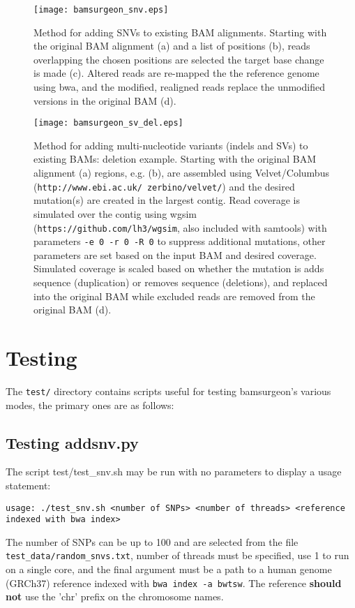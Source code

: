\documentclass[letterpaper,11pt]{article}
\begin{document}
\newpage %
\begin{figure}[!h]
\centering
\texttt{[image: bamsurgeon\_snv.eps]}
\caption{Method for adding SNVs to existing BAM alignments. Starting with the original BAM alignment (a) and a list of positions (b), reads overlapping the chosen positions are selected the target base change is made (c). Altered reads are re-mapped the the reference genome using bwa, and the modified, realigned reads replace the unmodified versions in the original BAM (d).}
\end{figure}

\newpage %

\begin{figure}[!h]
\centering
\texttt{[image: bamsurgeon\_sv\_del.eps]}
\caption{Method for adding multi-nucleotide variants (indels and SVs) to existing BAMs: deletion example. Starting with the original BAM alignment (a) regions, e.g. (b), are assembled using Velvet/Columbus (\texttt{http://www.ebi.ac.uk/~zerbino/velvet/}) and the desired mutation(s) are created in the largest contig. Read coverage is simulated over the contig using wgsim (\texttt{https://github.com/lh3/wgsim}, also included with samtools) with parameters \texttt{-e 0 -r 0 -R 0} to suppress additional mutations, other parameters are set based on the input BAM and desired coverage. Simulated coverage is scaled based on whether the mutation is adds sequence (duplication) or removes sequence (deletions), and replaced into the original BAM while excluded reads are removed from the original BAM (d).}
\end{figure}

\section{Testing}
The \texttt{test/} directory contains scripts useful for testing bamsurgeon's various modes, the primary ones are as follows:
\subsection{Testing addsnv.py}
The script {test/test\_snv.sh} may be run with no parameters to display a usage statement:
\begin{verbatim}
usage: ./test_snv.sh <number of SNPs> <number of threads> <reference indexed with bwa index>
\end{verbatim}

The number of SNPs can be up to 100 and are selected from the file \texttt{test\_data/random\_snvs.txt}, number of threads must be specified, use 1 to run on a single core, and the final argument must be a path to a human genome (GRCh37) reference indexed with \texttt{bwa index -a bwtsw}. The reference \textbf{should not} use the 'chr' prefix on the chromosome names.
\end{document}
